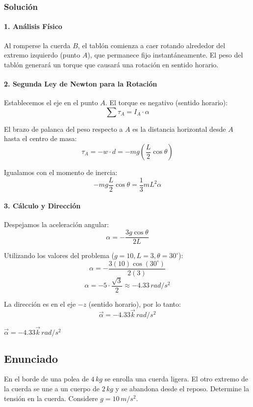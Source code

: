 \documentclass[12pt, a4paper]{article}
\begin{document}
\subsubsection*{Solución}

\paragraph{1. Análisis Físico}
Al romperse la cuerda $B$, el tablón comienza a caer rotando alrededor del extremo izquierdo (punto $A$), que permanece fijo instantáneamente. El peso del tablón generará un torque que causará una rotación en sentido horario.

\paragraph{2. Segunda Ley de Newton para la Rotación}
Establecemos el eje en el punto $A$. El torque es negativo (sentido horario):
$$ \sum \tau_A = I_A \cdot \alpha $$

El brazo de palanca del peso respecto a $A$ es la distancia horizontal desde $A$ hasta el centro de masa:
$$ \tau_A = -w \cdot d = -mg \left( \frac{L}{2} \cos \theta \right) $$

Igualamos con el momento de inercia:
$$ -mg \frac{L}{2} \cos \theta = \frac{1}{3} m L^2 \alpha $$

\paragraph{3. Cálculo y Dirección}
Despejamos la aceleración angular:
$$ \alpha = -\frac{3 g \cos \theta}{2 L} $$

Utilizando los valores del problema ($g=10, L=3, \theta=30^\circ$):
$$ \alpha = -\frac{3(10) \cos(30^\circ)}{2(3)} $$
$$ \alpha = -5 \cdot \frac{\sqrt{3}}{2} \approx -4.33 \, \si{rad/s^2} $$

La dirección es en el eje $-z$ (sentido horario), por lo tanto:
$$ \vec{\alpha} = -4.33\vec{k} \, \si{rad/s^2} $$

\begin{tcolorbox}[colback=green!5!white, colframe=green!50!black, title=Respuesta Final]
\centering \Large $\vec{\alpha} = -4.33\vec{k} \, \si{rad/s^2}$
\end{tcolorbox}

\newpage

\subsection*{Enunciado}
En el borde de una polea de $4 \, \si{kg}$ se enrolla una cuerda ligera. El otro extremo de la cuerda se une a un cuerpo de $2 \, \si{kg}$ y se abandona desde el reposo. Determine la tensión en la cuerda. Considere $g = 10 \, \si{m/s^2}$.
\end{document}
